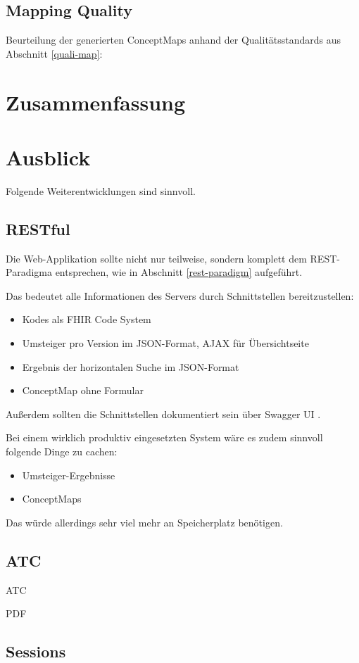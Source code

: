 \subsection{Mapping Quality}

Beurteilung der generierten ConceptMaps anhand der Qualitätsstandards aus Abschnitt \ref{quali-map}:



\section{Zusammenfassung}

\section{Ausblick}

Folgende Weiterentwicklungen sind sinnvoll.

\subsection{RESTful}

Die Web-Applikation sollte nicht nur teilweise, sondern komplett dem REST-Paradigma entsprechen, wie in Abschnitt \ref{rest-paradigm} aufgeführt. 

Das bedeutet alle Informationen des Servers durch Schnittstellen bereitzustellen: 

\begin{itemize}
\item Kodes als FHIR Code System
\item Umsteiger pro Version im JSON-Format, AJAX für Übersichtseite
\item Ergebnis der horizontalen Suche im JSON-Format
\item ConceptMap ohne Formular
\end{itemize}

Außerdem sollten die Schnittstellen dokumentiert sein über Swagger UI \cite{swagger}.

Bei einem wirklich produktiv eingesetzten System wäre es zudem sinnvoll folgende Dinge zu cachen:

\begin{itemize}
\item Umsteiger-Ergebnisse
\item ConceptMaps
\end{itemize}

Das würde allerdings sehr viel mehr an Speicherplatz benötigen. 

\subsection{ATC}

ATC \cite[ATC-Klassifikation]{bfarmatc}

PDF \cite{poppler}

\subsection{Sessions}

